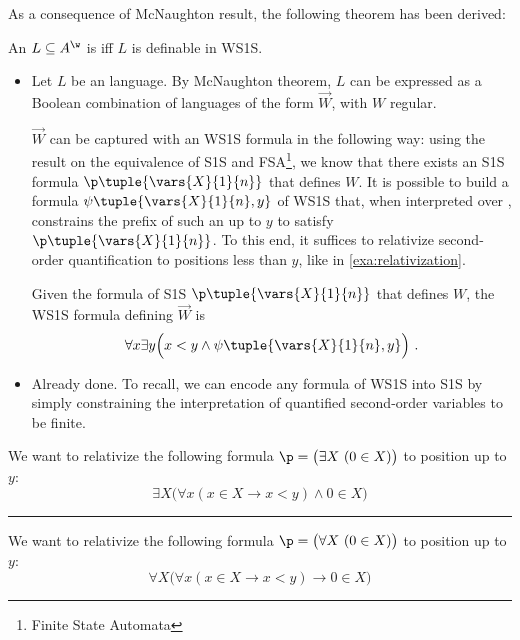 \documentclass[oneside]{academica}
\begin{document}
As a consequence of McNaughton result, the following theorem has been derived:
\begin{theorem}[Expressiveness of WS1S]\label{thm:exp_ws1s}
  An \wlan $L \subseteq \Aw$ is \wreg iff $L$ is definable in WS1S.
\end{theorem}

\begin{proof*}
  \begin{itemize}
    \item[\color{pink!200}$\Rightarrow$] Let $L$ be an \wreg language.
      By McNaughton theorem, $L$ can be expressed as a Boolean combination of languages of the form $\overrightarrow{W}$, with $W$ regular.
      
      $\overrightarrow{W}$ can be captured with an WS1S formula in the following way: using the result on the equivalence of S1S and FSA\footnote{Finite State Automata}, we know that there exists an S1S formula $\p \tuple{\vars{X}{1}{n}}$ that defines $W$.
      It is possible to build a formula $\psi \tuple{\vars{X}{1}{n}, y}$ of WS1S that, when interpreted over \wwords, constrains the prefix of such an \wword up to $y$ to satisfy $\p \tuple{\vars{X}{1}{n}}$.
      To this end, it suffices to relativize second-order quantification to positions less than $y$, like in \autoref{exa:relativization}.
      
      Given the formula of S1S $\p \tuple{\vars{X}{1}{n}}$ that defines $W$, the WS1S formula defining $\overrightarrow{W}$ is
      \begin{equation*}
        \forall x \exists y \Big(x < y \land \psi \tuple{\vars{X}{1}{n}, y} \Big)\ .
      \end{equation*}
  
    \item[\color{pink!200}$\Leftarrow$] Already done. To recall, we can encode any formula of WS1S into S1S by simply constraining the interpretation of quantified second-order variables to be finite.
  \end{itemize}
\end{proof*}

\begin{example}\label{exa:relativization}
  We want to relativize the following formula $\p = \big(\exists X \ (0 \in X)\big)$ to position up to $y$:
  \begin{equation*}
    \exists X \Big(\forall x ( x \in X \to x < y) \land 0 \in X \Big)
  \end{equation*}

  \textcolor{orange!140}{\rule{\textwidth}{1.5pt}}
  We want to relativize the following formula $\p = \big(\forall X \ (0 \in X)\big)$ to position up to $y$:
  \begin{equation*}
    \forall X \Big(\forall x (x \in X \to x < y ) \to 0 \in X \Big)
  \end{equation*}
\end{example}
\end{document}
